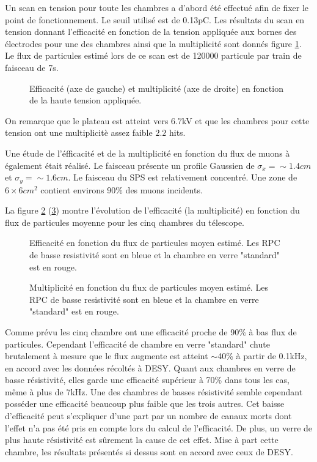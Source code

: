 Un scan en tension pour toute les chambres a d'abord été effectué afin de fixer le point de fonctionnement. Le seuil utilisé est de 0.13pC. Les résultats du scan en tension donnant l’efficacité en fonction de la tension appliquée aux bornes des électrodes pour une des chambres ainsi que la multiplicité sont donnés figure \ref{HVSPS}. Le flux de particules estimé lors de ce scan est de 120000 particule par train de faisceau de 7s.

\begin{figure}[!ht]
	\centering
	\scalebox{1.4}{}
	\caption{Efficacité (axe de gauche) et multiplicité (axe de droite) en fonction de la haute tension appliquée.}
	\label{HVSPS}
\end{figure}

On remarque que le plateau est atteint vers 6.7kV et que les chambres pour cette tension ont une multiplicitè assez faible $2.2$ hits. 

Une étude de l'éfficacité et de la multiplicité en fonction du flux de muons à également était réalisé. Le faisceau présente un profile Gaussien de $\sigma_{x}=\sim 1.4cm$ et $\sigma_{y}=\sim 1.6cm$. Le faisceau du SPS est relativement concentré. Une zone de $6\times6cm^{2}$ contient environs 90\% des muons incidents.

La figure \ref{RateSPS} (\ref{MultiplictySPS}) montre l'évolution de l'efficacité (la multiplicité) en fonction du flux de particules moyenne pour les cinq chambres du télescope.

\begin{figure}[!ht]
	\centering
	\scalebox{1.4}{}
	\caption{Efficacité en fonction du flux de particules moyen estimé. Les RPC de basse resistivité sont en bleue et la chambre en verre "standard" est en rouge.}
	\label{RateSPS}
\end{figure}

\begin{figure}[!ht]
	\centering
	\scalebox{1.4}{}
	\caption{Multiplicité en fonction du flux de particules moyen estimé. Les RPC de basse resistivité sont en bleue et la chambre en verre "standard" est en rouge.}
	\label{MultiplictySPS}
\end{figure}

Comme prévu les cinq chambre ont une efficacité proche de 90\% à bas flux de particules. Cependant l'efficacité de  chambre en verre "standard" chute brutalement à mesure que le flux augmente est atteint $\sim $40\% à partir de 0.1kHz, en accord avec les données récoltés à DESY. Quant aux chambres en verre de basse résistivité, elles garde une efficacité supérieur à 70\% dans tous les cas, même à plus de 7kHz. Une des chambres de basses résistivité semble cependant posséder une efficacité beaucoup plus faible que les trois autres. Cet baisse d'efficacité peut s'expliquer d'une part par un nombre de canaux morts dont l'effet n'a pas été pris en compte lors du calcul de l'efficacité. De plus, un verre de plus haute résistivité est sûrement la cause de cet effet. Mise à part cette chambre, les résultats présentés si dessus sont en accord avec ceux de DESY.

